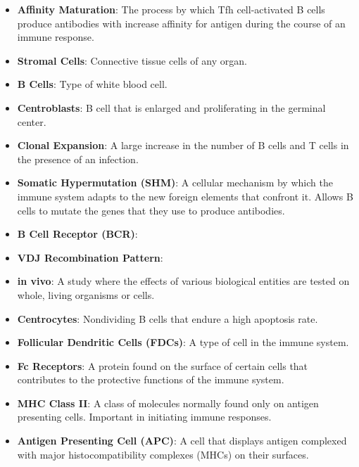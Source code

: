 \documentclass[english]{article}
\begin{document}
\begin{itemize}


\item \textbf{Affinity Maturation}: The process by which Tfh cell-activated B cells produce antibodies with increase affinity for antigen during the course of an immune response. 

\item \textbf{Stromal Cells}: Connective tissue cells of any organ.
 
\item \textbf{B Cells}: Type of white blood cell. 

\item \textbf{Centroblasts}: B cell that is enlarged and proliferating in the germinal center.

\item \textbf{Clonal Expansion}: A large increase in the number of B cells and T cells in the presence of an infection. 

\item \textbf{Somatic Hypermutation (SHM)}: A cellular mechanism by which the immune system adapts to the new foreign elements that confront it. Allows B cells to mutate the genes that they use to produce antibodies. 

\item \textbf{B Cell Receptor (BCR)}:

\item \textbf{VDJ Recombination Pattern}: 

\item \textbf{in vivo}: A study where the effects of various biological entities are tested on whole, living organisms or cells. 

\item \textbf{Centrocytes}: Nondividing B cells that endure a high apoptosis rate. 

\item \textbf{Follicular Dendritic Cells (FDCs)}: A type of cell in the immune system.

\item \textbf{Fc Receptors}: A protein found on the surface of certain cells that contributes to the protective functions of the immune system. 

\item \textbf{MHC Class II}: A class of molecules normally found only on antigen presenting cells. Important in initiating immune responses. 

\item \textbf{Antigen Presenting Cell (APC)}: A cell that displays antigen complexed with major histocompatibility complexes (MHCs) on their surfaces.


\end{itemize}
\end{document}
